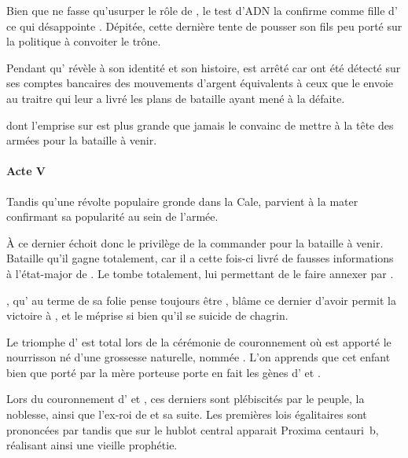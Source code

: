 Bien que \ela{} ne fasse qu’usurper le rôle de \princesse{}, le test d’ADN la confirme comme fille d’\roi{} ce qui désappointe \reine. Dépitée, cette dernière tente de pousser son fils \vladimir{} peu porté sur la politique à convoiter le trône.

Pendant qu’\elena{} révèle à \ela{} son identité et son histoire, \vladimir{} est arrêté car ont été détecté sur ses comptes bancaires des mouvements d’argent équivalents à ceux que le \campoppose{} envoie au traitre qui leur a livré les plans de bataille ayant mené à la défaite.

\ela{} dont l’emprise sur \roi{} est plus grande que jamais le convainc de mettre \elena{} à la tête des armées pour la bataille à venir.

\paragraph{Acte V}
Tandis qu’une révolte populaire gronde dans la Cale, \elena{} parvient à la mater confirmant sa popularité au sein de l’armée.

À ce dernier échoit donc le privilège de la commander pour la bataille à venir. Bataille qu’il gagne totalement, car il a cette fois-ci livré de fausses informations à l’état-major de \campoppose{}. Le \campoppose{} tombe totalement, lui permettant de le faire annexer par \campprincipal{}.

\ela{}, qu’\roi{} au terme de sa folie pense toujours être \princesse{}, blâme ce dernier d’avoir permit la victoire à \elena{}, et le méprise si bien qu’il se suicide de chagrin.

Le triomphe d’\elena{} est total lors de la cérémonie de couronnement où est apporté le nourrisson né d’une grossesse naturelle, nommée \cleopatre{}. L’on apprends que cet enfant bien que porté par la mère porteuse \catin{} porte en fait les gènes d’\elena{} et \ela{}.

Lors du couronnement d’\elena{} et \ela{}, ces derniers sont plébiscités par le peuple, la noblesse, ainsi que l’ex-roi de \campoppose{} et sa suite. Les premières lois égalitaires sont prononcées par \elena{} tandis que sur le hublot central apparait Proxima centauri~b, réalisant ainsi une vieille prophétie.

